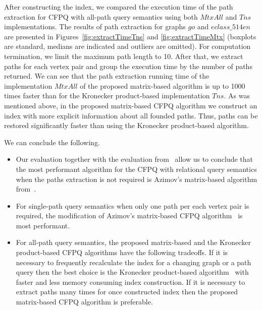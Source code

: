 After constructing the index, we compared the execution time of the path extraction for CFPQ with all-path query semantics using both $MtxAll$ and $Tns$ implementations. The results of path extraction for graphs $go$ and $eclass\_514en$ are presented in Figures~\ref{fig:extractTimeTns} and \ref{fig:extractTimeMtx} (boxplots are standard, medians are indicated and outliers are omitted). For computation termination, we limit the maximum path length to 10. After that, we extract paths for each vertex pair and group the execution time by the number of paths returned. We can see that the path extraction running time of the implementation $MtxAll$ of the proposed matrix-based algorithm is up to 1000 times faster than for the Kronecker product-based implementation $Tns$. As was mentioned above, in the proposed matrix-based CFPQ algorithm we construct an index with more explicit information about all founded paths. Thus, paths can be restored significantly faster than using the Kronecker product-based algorithm.

We can conclude the following.

\begin{itemize}
	\item 
	Our evaluation together with the evaluation from~\cite{10.1145/3398682.3399163, kron} allow us to conclude that the most performant algorithm for the CFPQ with relational query semantics when the paths extraction is not required is Azimov's matrix-based algorithm from~\cite{Azimov:2018:CPQ:3210259.3210264}.
	\item For single-path query semantics when only one path per each vertex pair is required, the modification of Azimov's matrix-based CFPQ algorithm~\cite{10.1145/3398682.3399163} is most performant.
	\item For all-path query semantics, the proposed matrix-based and the Kronecker product-based CFPQ algorithms have the following tradeoffs. If it is necessary to frequently recalculate the index for a changing graph or a path query then the best choice is the Kronecker product-based algorithm~\cite{kron} with faster and less memory consuming index construction. If it is necessary to extract paths many times for once constructed index then the proposed matrix-based CFPQ algorithm is preferable.
\end{itemize}


